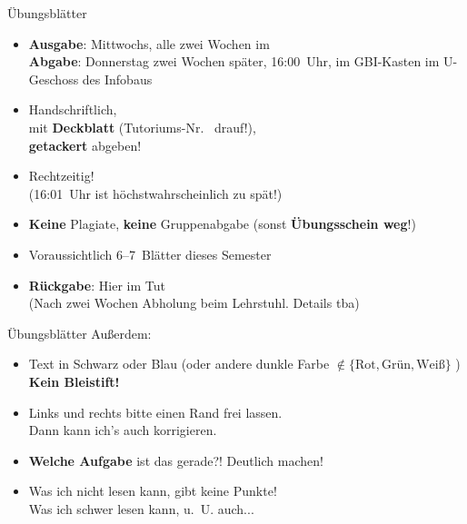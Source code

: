 \begin{frame}{Übungsblätter}
	\begin{itemize}
		\item \textbf{Ausgabe}: Mittwochs, alle zwei Wochen im \ILIAS \\
			  \textbf{Abgabe}: Donnerstag zwei Wochen später, 16:00~Uhr, im GBI-Kasten im U-Geschoss des Infobaus
		\pause
		\item Handschriftlich, \\ 
		mit \textbf{Deckblatt} (Tutoriums-Nr. \mytutnumber\  drauf!), \\ 
		\textbf{getackert} abgeben!
		\item Rechtzeitig! \\(16:01~Uhr ist höchstwahrscheinlich zu spät!)
		\item \textbf{Keine} Plagiate, \textbf{keine} Gruppenabgabe (sonst \textbf{Übungsschein weg}!) 
		\pause
		\item Voraussichtlich 6--7~Blätter dieses Semester
		\item \textbf{Rückgabe}: Hier im Tut \\ (Nach zwei Wochen Abholung beim Lehrstuhl. Details tba)
	\end{itemize}
	
\end{frame}

\begin{frame}{Übungsblätter}
	Außerdem:
	\begin{itemize}
		\item Text in Schwarz oder Blau (oder andere dunkle Farbe $\notin \{\text{Rot}, \text{Grün}, \text{Weiß}\}$ ) \\
			  \textbf{Kein Bleistift!}
		\item Links und rechts bitte einen Rand frei lassen. \\
			  Dann kann ich's auch korrigieren. \smiley
		\item \textbf{Welche Aufgabe} ist das gerade?! \impl Deutlich machen!
		\item Was ich nicht lesen kann, gibt keine Punkte! \\
			  \small Was ich schwer lesen kann, u.~U. auch... 
	\end{itemize}
\end{frame}



